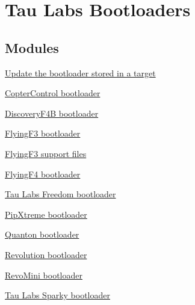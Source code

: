 \hypertarget{group___tau_labs_bootloader}{\section{\-Tau \-Labs \-Bootloaders}
\label{group___tau_labs_bootloader}
}
\subsection*{\-Modules}
\begin{DoxyCompactItemize}
\item 
\hyperlink{group___bootloader_update}{\-Update the bootloader stored in a target}
\item 
\hyperlink{group___copter_control_b_l}{\-Copter\-Control bootloader}
\item 
\hyperlink{group___discovery_f4_b_l}{\-Discovery\-F4\-B bootloader}
\item 
\hyperlink{group___flying_f3_b_l}{\-Flying\-F3 bootloader}
\item 
\hyperlink{group___flying_f3}{\-Flying\-F3 support files}
\item 
\hyperlink{group___flying_f4_b_l}{\-Flying\-F4 bootloader}
\item 
\hyperlink{group___freedom_b_l}{\-Tau Labs Freedom bootloader}
\item 
\hyperlink{group___pip_xtreme_b_l}{\-Pip\-Xtreme bootloader}
\item 
\hyperlink{group___quanton_b_l}{\-Quanton bootloader}
\item 
\hyperlink{group___revolution_b_l}{\-Revolution bootloader}
\item 
\hyperlink{group___revo_mini_b_l}{\-Revo\-Mini bootloader}
\item 
\hyperlink{group___sparky_b_l}{\-Tau Labs Sparky bootloader}
\end{DoxyCompactItemize}
